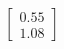 \documentclass[preview]{standalone}
\begin{document}
\begin{align*}
\begin{bmatrix} 0.55 \\ 1.08 \end{bmatrix}
\end{align*}
\end{document}
